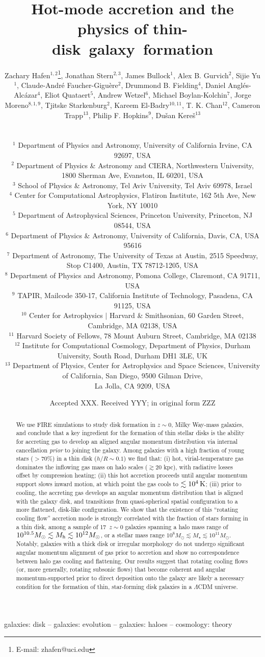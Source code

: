 \documentclass[fleqn,usenatbib]{mnras}
\title[Rotating cooling flows and thin galactic disks]{Hot-mode accretion and the physics of thin-disk~galaxy~formation}
\author[Hafen, Stern, Bullock et al.]{
\parbox{\textwidth}{
Zachary Hafen$^{1,2}$\thanks{E-mail: zhafen@uci.edu},
Jonathan Stern$^{2,3}$,
James Bullock$^{1}$,
Alex B. Gurvich$^2$,
Sijie Yu$^1$,
Claude-Andr\'e Faucher-Gigu\`ere$^2$,
Drummond B. Fielding$^4$,
Daniel Angl\'es-Alc\'azar$^4$,
Eliot Quataert$^5$,
Andrew Wetzel$^6$,
Michael Boylan-Kolchin$^7$,
Jorge Moreno$^{8,1,9}$,
Tjitske Starkenburg$^2$,
Kareem El-Badry$^{10,11}$,
T. K. Chan$^{12}$,
Cameron Trapp$^{13}$,
Philip F. Hopkins$^{9}$,
Du\v{s}an Kere\v{s}$^{13}$
} \vspace{0.4cm}\\
\parbox{\textwidth}{
$^1$ Department of Physics and Astronomy, University of California Irvine, CA 92697, USA \\
$^2$ Department of Physics \& Astronomy and CIERA, Northwestern University, 1800 Sherman Ave, Evanston, IL 60201, USA \\
$^3$ School of Physics \& Astronomy, Tel Aviv University, Tel Aviv 69978, Israel \\
$^4$ Center for Computational Astrophysics, Flatiron Institute, 162 5th Ave, New York, NY 10010 \\
$^5$ Department of Astrophysical Sciences, Princeton University, Princeton, NJ 08544, USA \\
$^6$ Department of Physics \& Astronomy, University of California, Davis, CA, USA 95616 \\
$^7$ Department of Astronomy, The University of Texas at Austin, 2515 Speedway, Stop C1400, Austin, TX 78712-1205, USA \\
$^8$ Department of Physics and Astronomy, Pomona College, Claremont, CA 91711, USA \\
$^{9}$ TAPIR, Mailcode 350-17, California Institute of Technology, Pasadena, CA 91125, USA \\
$^{10}$ Center for Astrophysics $|$ Harvard \& Smithsonian, 60 Garden Street, Cambridge, MA 02138, USA \\
$^{11}$ Harvard Society of Fellows, 78 Mount Auburn Street, Cambridge, MA 02138 \\
$^{12}$ Institute for Computational Cosmology, Department of Physics, Durham University, South Road, Durham DH1 3LE, UK \\
$^{13}$ Department of Physics, Center for Astrophysics and Space Sciences, University of California, San Diego, 9500 Gilman Drive, \\ La Jolla, CA 9209, USA \\
}
}
\date{Accepted XXX. Received YYY; in original form ZZZ}
\newcommand{\Nsample}{17}
\begin{document}
\label{firstpage}
\pagerange{\pageref{firstpage}--\pageref{lastpage}}
\maketitle

\begin{abstract}
We use FIRE simulations to study disk formation in $z\sim 0$, Milky Way-mass galaxies, and conclude that a key ingredient for the formation of thin stellar disks is the ability for accreting gas to develop an aligned angular momentum distribution via internal cancellation \textit{prior} to joining the galaxy.
Among galaxies with a high fraction of young stars ($>70\%$) in a thin disk ($h/R \sim 0.1$) we find that:
(i) hot, virial-temperature gas dominates the inflowing gas mass on halo scales ($\gtrsim 20$ kpc), with radiative losses offset by compression heating;
(ii) this hot accretion proceeds until angular momentum support slows inward motion, at which point the gas cools to $\lesssim10^4\,{\rm K}$;
(iii) prior to cooling, the accreting gas develops an angular momentum distribution that is aligned with the galaxy disk, and transitions from quasi-spherical spatial configuration to a more flattened, disk-like configuration.
We show that the existence of this ``rotating cooling flow'' accretion mode is strongly correlated with the fraction of stars forming in a thin disk, among a sample of \Nsample\ $z\sim0$ galaxies spanning a halo mass range of $10^{10.5} M_\odot \lesssim M_{\rm h} \lesssim 10^{12} M_\odot$, or a stellar mass range $10^8 M_\odot \lesssim M_\star \lesssim 10^{11} M_\odot$.
Notably, galaxies with a thick disk or irregular morphology do not undergo significant angular momentum alignment of gas prior to accretion and show no correspondence between halo gas cooling and flattening.
Our results suggest that rotating cooling flows (or, more generally, rotating subsonic flows) that become coherent and angular momentum-supported prior to direct deposition onto the galaxy are likely a necessary condition for the formation of thin, star-forming disk galaxies in a $\Lambda$CDM universe.
\end{abstract}

\begin{keywords}
galaxies: disk -- galaxies: evolution -- galaxies: haloes -- cosmology: theory
\end{keywords}
\end{document}
